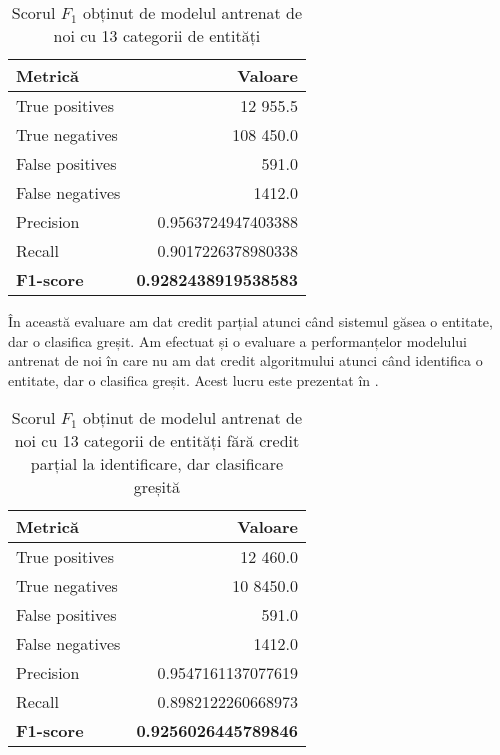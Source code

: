 \begin{center}
\begin{table}[htb]
  \caption{Scorul $F_1$ obținut de modelul antrenat de noi cu 13 categorii de entități}
  \begin{tabular}{|l|r|}
  \hline
   Metrică & Valoare\\
   \hline
  True positives & 12 955.5 \\
  True negatives & 108 450.0 \\
  False positives & 591.0 \\
  False negatives & 1412.0 \\
    \hline
  Precision & 0.9563724947403388 \\
  Recall & 0.9017226378980338 \\
  \hline
  \textbf{F1-score} & \textbf{0.9282438919538583} \\
   \hline
   
  \end{tabular}
  \label{table:f1-score-13-class}
\end{table}
\end{center}

În această evaluare am dat credit parțial atunci când sistemul găsea o entitate, dar o clasifica greșit. Am efectuat și o evaluare a performanțelor modelului antrenat de noi în care nu am dat credit algoritmului atunci când identifica o entitate, dar o clasifica greșit. Acest lucru este prezentat în .

\begin{center}
\begin{table}[htb]
  \caption{Scorul $F_1$ obținut de modelul antrenat de noi cu 13 categorii de entități fără credit parțial la identificare, dar clasificare greșită}
  \begin{tabular}{|l|r|}
  \hline
   Metrică & Valoare\\
   \hline
  True positives & 12 460.0 \\
  True negatives & 10 8450.0 \\
  False positives & 591.0 \\
  False negatives & 1412.0 \\
    \hline
  Precision & 0.9547161137077619\\
  Recall & 0.8982122260668973 \\
  \hline
  \textbf{F1-score} & \textbf{0.9256026445789846} \\
   \hline
   
  \end{tabular}
  \label{table:f1-score-13-class-no-credit}
\end{table}
\end{center}


